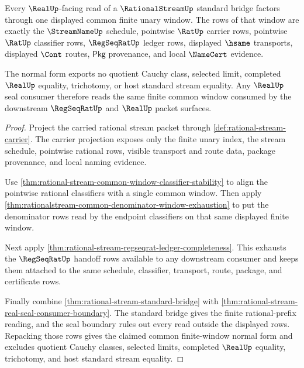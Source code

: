 \begin{theorem}\label{thm:rational-stream-real-seal-common-window-normal-form}
Every $\RealUp$-facing read of a $\RationalStreamUp$ standard bridge factors
through one displayed common finite unary window. The rows of that window are
exactly the $\StreamNameUp$ schedule, pointwise $\RatUp$ carrier rows,
pointwise $\RatUp$ classifier rows, $\RegSeqRatUp$ ledger rows, displayed
$\hsame$ transports, displayed $\Cont$ routes, $\mathsf{Pkg}$ provenance, and
local $\NameCert$ evidence.

The normal form exports no quotient Cauchy class, selected limit, completed
$\RealUp$ equality, trichotomy, or host standard stream equality. Any
$\RealUp$ seal consumer therefore reads the same finite common window consumed
by the downstream $\RegSeqRatUp$ and $\RealUp$ packet surfaces.
\end{theorem}
\begin{proof}
Project the carried rational stream packet through
\autoref{def:rational-stream-carrier}. The carrier projection exposes only the
finite unary index, the stream schedule, pointwise rational rows, visible
transport and route data, package provenance, and local naming evidence.

Use \autoref{thm:rational-stream-common-window-classifier-stability} to align
the pointwise rational classifiers with a single common window. Then apply
\autoref{thm:rationalstream-common-denominator-window-exhaustion} to put the
denominator rows read by the endpoint classifiers on that same displayed finite
window.

Next apply \autoref{thm:rational-stream-regseqrat-ledger-completeness}. This
exhausts the $\RegSeqRatUp$ handoff rows available to any downstream consumer
and keeps them attached to the same schedule, classifier, transport, route,
package, and certificate rows.

Finally combine \autoref{thm:rational-stream-standard-bridge} with
\autoref{thm:rational-stream-real-seal-consumer-boundary}. The standard bridge
gives the finite rational-prefix reading, and the seal boundary rules out every
read outside the displayed rows. Repacking those rows gives the claimed common
finite-window normal form and excludes quotient Cauchy classes, selected
limits, completed $\RealUp$ equality, trichotomy, and host standard stream
equality.
\end{proof}


